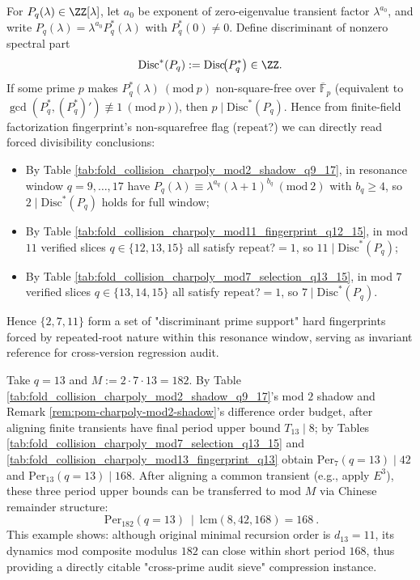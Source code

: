 \begin{remark}[Discriminant prime support fingerprint: repeat? \texorpdfstring{$\Rightarrow$}{=>} \texorpdfstring{$p$}{p}-divisibility (auditable)]\label{rem:pom-discriminant-prime-support}
For \(P_q(\lambda)\in\ZZ[\lambda]\), let \(a_0\) be exponent of zero-eigenvalue transient factor \(\lambda^{a_0}\), and write
\(
P_q(\lambda)=\lambda^{a_0}P_q^\ast(\lambda)
\)
with \(P_q^\ast(0)\ne 0\).
Define discriminant of nonzero spectral part
\[
\mathrm{Disc}^\ast(P_q):=\mathrm{Disc}\!\bigl(P_q^\ast\bigr)\in\ZZ.
\]
If some prime \(p\) makes \(P_q^\ast(\lambda)\ (\mathrm{mod}\ p)\) non-square-free over \(\overline{\mathbb{F}}_p\) (equivalent to \(\gcd(P_q^\ast,(P_q^\ast)')\not\equiv 1\ (\mathrm{mod}\ p)\)), then \(p\mid \mathrm{Disc}^\ast(P_q)\).
Hence from finite-field factorization fingerprint's non-squarefree flag (repeat?) we can directly read forced divisibility conclusions:
\begin{itemize}
  \item By Table \ref{tab:fold_collision_charpoly_mod2_shadow_q9_17}, in resonance window \(q=9,\dots,17\) have
  \(P_q(\lambda)\equiv \lambda^{a_q}(\lambda+1)^{b_q}\ (\mathrm{mod}\ 2)\) with \(b_q\ge 4\), so \(2\mid \mathrm{Disc}^\ast(P_q)\) holds for full window;
  \item By Table \ref{tab:fold_collision_charpoly_mod11_fingerprint_q12_15}, in mod \(11\) verified slices \(q\in\{12,13,15\}\) all satisfy repeat?\(=1\), so \(11\mid \mathrm{Disc}^\ast(P_q)\);
  \item By Table \ref{tab:fold_collision_charpoly_mod7_selection_q13_15}, in mod \(7\) verified slices \(q\in\{13,14,15\}\) all satisfy repeat?\(=1\), so \(7\mid \mathrm{Disc}^\ast(P_q)\).
\end{itemize}
Hence \(\{2,7,11\}\) form a set of "discriminant prime support" hard fingerprints forced by repeated-root nature within this resonance window, serving as invariant reference for cross-version regression audit.
\end{remark}
\begin{remark}[Period collapse under composite modulus: final period upper bound for \texorpdfstring{$q=13$}{q=13} mod \texorpdfstring{$182$}{182}]\label{rem:pom-mod182-period-collapse-q13}
Take \(q=13\) and \(M:=2\cdot 7\cdot 13=182\).
By Table \ref{tab:fold_collision_charpoly_mod2_shadow_q9_17}'s mod \(2\) shadow and Remark \ref{rem:pom-charpoly-mod2-shadow}'s difference order budget, after aligning finite transients have final period upper bound \(T_{13}\mid 8\);
by Tables \ref{tab:fold_collision_charpoly_mod7_selection_q13_15} and \ref{tab:fold_collision_charpoly_mod13_fingerprint_q13} obtain
\(
\mathrm{Per}_7(q=13)\mid 42
\)
and
\(
\mathrm{Per}_{13}(q=13)\mid 168
\).
After aligning a common transient (e.g., apply \(E^{3}\)), these three period upper bounds can be transferred to mod \(M\) via Chinese remainder structure:
\[
\boxed{\ \mathrm{Per}_{182}(q=13)\ \mid\ \mathrm{lcm}(8,42,168)=168\ }.
\]
This example shows: although original minimal recursion order is \(d_{13}=11\), its dynamics mod composite modulus \(182\) can close within short period \(168\), thus providing a directly citable "cross-prime audit sieve" compression instance.
\end{remark}







